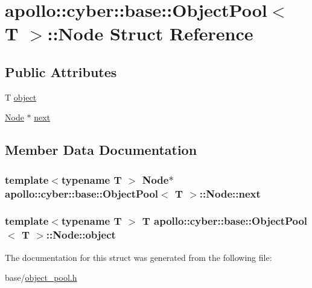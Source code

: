 \hypertarget{structapollo_1_1cyber_1_1base_1_1ObjectPool_1_1Node}{\section{apollo\-:\-:cyber\-:\-:base\-:\-:Object\-Pool$<$ T $>$\-:\-:Node Struct Reference}
\label{structapollo_1_1cyber_1_1base_1_1ObjectPool_1_1Node}
}
\subsection*{Public Attributes}
\begin{DoxyCompactItemize}
\item 
T \hyperlink{structapollo_1_1cyber_1_1base_1_1ObjectPool_1_1Node_a991d230da210daa4ee3ce7bada58a4e8}{object}
\item 
\hyperlink{structapollo_1_1cyber_1_1base_1_1ObjectPool_1_1Node}{Node} $\ast$ \hyperlink{structapollo_1_1cyber_1_1base_1_1ObjectPool_1_1Node_a989677551881b0ef8130081dd737423a}{next}
\end{DoxyCompactItemize}


\subsection{Member Data Documentation}
\hypertarget{structapollo_1_1cyber_1_1base_1_1ObjectPool_1_1Node_a989677551881b0ef8130081dd737423a}{
\subsubsection[{next}]{\setlength{\rightskip}{0pt plus 5cm}template$<$typename T $>$ {\bf Node}$\ast$ {\bf apollo\-::cyber\-::base\-::\-Object\-Pool}$<$ T $>$\-::Node\-::next}}\label{structapollo_1_1cyber_1_1base_1_1ObjectPool_1_1Node_a989677551881b0ef8130081dd737423a}
\hypertarget{structapollo_1_1cyber_1_1base_1_1ObjectPool_1_1Node_a991d230da210daa4ee3ce7bada58a4e8}{
\subsubsection[{object}]{\setlength{\rightskip}{0pt plus 5cm}template$<$typename T $>$ T {\bf apollo\-::cyber\-::base\-::\-Object\-Pool}$<$ T $>$\-::Node\-::object}}\label{structapollo_1_1cyber_1_1base_1_1ObjectPool_1_1Node_a991d230da210daa4ee3ce7bada58a4e8}


The documentation for this struct was generated from the following file\-:\begin{DoxyCompactItemize}
\item 
base/\hyperlink{object__pool_8h}{object\-\_\-pool.\-h}\end{DoxyCompactItemize}
